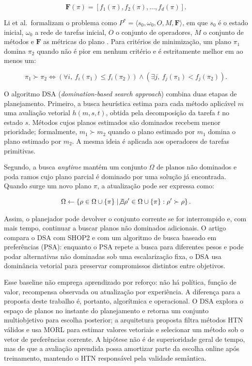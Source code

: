 \begin{equation}
\mathbf{F}(\pi) = [f_1(\pi),f_2(\pi),\dots,f_d(\pi)].
\end{equation}

Li et al.\ formalizam o problema como
$P^*=\langle s_0,\omega_0,O,M,\mathbf{F}\rangle$, em que $s_0$ é o estado
inicial, $\omega_0$ a rede de tarefas inicial, $O$ o conjunto de operadores,
$M$ o conjunto de métodos e $\mathbf{F}$ as métricas do plano
\cite{li2024mohtn}. Para critérios de minimização, um plano $\pi_1$ domina
$\pi_2$ quando não é pior em nenhum critério e é estritamente melhor em ao
menos um:

\begin{equation}
\pi_1 \succ \pi_2
\iff
\left(\forall i,\ f_i(\pi_1) \leq f_i(\pi_2)\right)
\land
\left(\exists j,\ f_j(\pi_1) < f_j(\pi_2)\right).
\end{equation}

O algoritmo DSA (\textit{domination-based search approach}) combina duas
etapas de planejamento. Primeiro, a busca heurística estima para cada método
aplicável $m$ uma avaliação vetorial $h(m,s,t)$, obtida pela decomposição da
tarefa $t$ no estado $s$. Métodos cujos planos estimados são dominados recebem
menor prioridade; formalmente, $m_1 \succ m_2$ quando o plano estimado por
$m_1$ domina o plano estimado por $m_2$. A mesma ideia é aplicada aos
operadores de tarefas primitivas.

Segundo, a busca \textit{anytime} mantém um conjunto $\Omega$ de planos não
dominados e poda ramos cujo plano parcial é dominado por uma solução já
encontrada. Quando surge um novo plano $\pi$, a atualização pode ser expressa
como:

\begin{equation}
\Omega \leftarrow
\left\{\rho \in \Omega \cup \{\pi\}
\mid \not\exists\rho' \in \Omega \cup \{\pi\}: \rho' \succ \rho\right\}.
\end{equation}

Assim, o planejador pode devolver o conjunto corrente se for interrompido e,
com mais tempo, continuar a buscar planos não dominados adicionais. O artigo
compara o DSA com SHOP2 e com um algoritmo de busca baseado em preferências
(PSA): enquanto o PSA repete a busca para diferentes pesos e pode podar
alternativas não dominadas sob uma escalarização fixa, o DSA usa dominância
vetorial para preservar compromissos distintos entre objetivos.

Esse baseline não emprega aprendizado por reforço: não há política, função de
valor, recompensa observada ou atualização por experiência. A diferença para a
proposta deste trabalho é, portanto, algorítmica e operacional. O DSA explora
o espaço de planos no instante do planejamento e retorna um conjunto
multiobjetivo para escolha posterior; a arquitetura proposta filtra métodos
HTN válidos e usa MORL para estimar valores vetoriais e selecionar um método
sob o vetor de preferências corrente. A hipótese não é de superioridade geral
de tempo, mas de que a avaliação aprendida possa amortizar parte da escolha
online após treinamento, mantendo o HTN responsável pela validade semântica.

